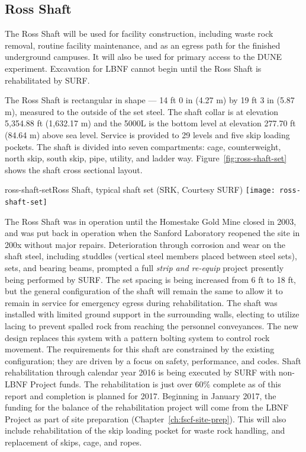 \subsection{Ross Shaft}
\label{sec:fscf-und-shafts-ross}

The Ross Shaft will be used for facility construction, including waste rock removal, routine facility maintenance, and as an egress path for the finished underground campuses. It will also be used for primary access to the DUNE experiment. Excavation for LBNF cannot begin until the Ross Shaft is rehabilitated by  SURF.

The Ross Shaft is rectangular in shape --- 14 ft 0 in (4.27 m) by 19 ft 3 in (5.87 m), measured to the outside of the set steel. The shaft collar is at elevation 5,354.88 ft (1,632.17 m) and the 5000L is the bottom level at elevation 277.70 ft (84.64 m) above sea level. 
 Service is provided to 29 levels and five skip loading pockets. The shaft is divided into seven compartments: cage, counterweight, north skip, south skip, pipe, utility, and ladder way. Figure~\ref{fig:ross-shaft-set} shows the shaft cross sectional layout. 


\begin{cdrfigure}{ross-shaft-set}{Ross Shaft, typical shaft set (SRK, Courtesy SURF)}
\texttt{[image: ross-shaft-set]}
\end{cdrfigure}

The Ross Shaft was in operation until the Homestake Gold Mine closed in 2003, and was put back in operation when the Sanford Laboratory reopened
 the site in 200x  without major repairs.  Deterioration through corrosion and wear on the shaft steel, including studdles (vertical steel members placed between steel sets), sets, and bearing beams, prompted a full \textit{strip and re-equip} project presently being performed by  SURF. 
The set spacing is being increased from 6 ft to 18 ft, but the general configuration of the shaft will remain the same to allow it to remain in service for emergency egress during rehabilitation. 
The shaft was installed with limited ground support in the surrounding walls, electing to utilize lacing to prevent spalled rock from reaching the personnel conveyances. 
The new design replaces this system with a pattern bolting system to control rock movement. 
The requirements for this shaft are constrained by the existing configuration; they are driven by a focus on safety, performance, and codes.
%
Shaft rehabilitation through calendar year 2016 is being executed by SURF with non-LBNF Project funds. The rehabilitation is just over 60\% complete as of this report and completion is planned for 2017. Beginning in January 2017, the funding for the balance of the rehabilitation project will come from the LBNF Project as part of site preparation (Chapter~\ref{ch:fscf-site-prep}).  This will also include rehabilitation of the skip loading pocket for waste rock handling, and replacement of skips, cage, and ropes.

